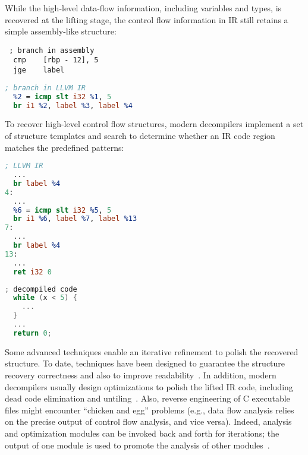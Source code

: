 While the high-level data-flow information, including variables and types, is
recovered at the lifting stage, the control flow information in IR still
retains a simple assembly-like structure:

\vspace*{3pt}
\noindent\hspace*{36pt}\begin{minipage}{.40\linewidth}
\begin{lstlisting}
 ; branch in assembly
  cmp	 [rbp - 12], 5
  jge	 label
\end{lstlisting}
\end{minipage}\hspace*{24pt}
\begin{minipage}{.40\linewidth}
\begin{lstlisting}[language=llvm]
 ; branch in LLVM IR
  %2 = icmp slt i32 %1, 5
  br i1 %2, label %3, label %4
\end{lstlisting}
\end{minipage}

To recover high-level control flow structures, modern decompilers implement a
set of structure templates and search to determine whether an IR code region
matches the predefined patterns:

\vspace*{3pt}
\noindent\hspace*{36pt}\begin{minipage}{.40\linewidth}
\begin{lstlisting}[language=llvm]
 ; LLVM IR
  ...
  br label %4
4:
  ...
  %6 = icmp slt i32 %5, 5
  br i1 %6, label %7, label %13
7:
  ...
  br label %4
13:
  ...
  ret i32 0
\end{lstlisting}
\end{minipage}\hspace*{24pt}
\begin{minipage}{.40\linewidth}
\begin{lstlisting}[language=C]
 ; decompiled code
  while (x < 5) {
    ...
  }
  ...
  return 0;
\end{lstlisting}
\end{minipage}

Some advanced techniques enable an iterative refinement to polish the
recovered structure. To date, techniques have been designed to guarantee the
structure recovery correctness and also to improve
readability~\cite{brumley2013native,yakdan2015no}. In addition, modern
decompilers usually design optimizations to polish the lifted IR code,
including dead code elimination and untiling~\cite{brumley2013native,cifuentes1994reverse,kvroustek2017retdec}.
Also, reverse engineering of C executable files might encounter ``chicken and
egg'' problems (e.g., data flow analysis relies on the precise output of
control flow analysis, and vice versa). Indeed, analysis and optimization
modules can be invoked back and forth for iterations; the output of one module
is used to promote the analysis of other modules~\cite{kvroustek2017retdec}.

